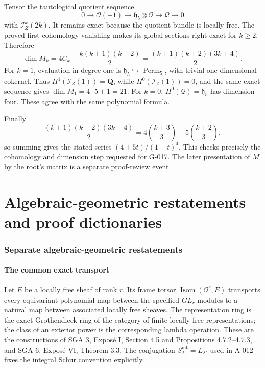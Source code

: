 \documentclass[
  10pt,
]{article}
\begin{document}
Tensor the tautological quotient sequence \[
0\to\mathcal O(-1)\to\mathfrak h_5\otimes\mathcal O
\to\mathcal Q\to0
\] with \(\mathcal I_Z^k(2k)\). It remains exact because the quotient
bundle is locally free. The proved first-cohomology vanishing makes its
global sections right exact for \(k\ge2\). Therefore \[
\dim M_k=4C_k-\frac{k(k+1)(k-2)}2
=\frac{(k+1)(k+2)(3k+4)}2.
\] For \(k=1\), evaluation in degree one is
\(\mathfrak h_5\hookrightarrow\operatorname{Perm}_5\), with trivial
one-dimensional cokernel. Thus \(H^1(\mathcal I_Z(1))=\mathbf Q\), while
\(H^0(\mathcal I_Z(1))=0\), and the same exact sequence gives
\(\dim M_1=4\cdot5+1=21\). For \(k=0\),
\(H^0(\mathcal Q)=\mathfrak h_5\) has dimension four. These agree with
the same polynomial formula.

Finally \[
\frac{(k+1)(k+2)(3k+4)}2
=4\binom{k+3}{3}+5\binom{k+2}{3},
\] so summing gives the stated series \((4+5t)/(1-t)^4\). This checks
precisely the cohomology and dimension step requested for G-017. The
later presentation of \(M\) by the root's matrix is a separate
proof-review event.

\part{Algebraic-geometric restatements and proof dictionaries}

\section{Separate algebraic-geometric
restatements}\label{separate-algebraic-geometric-restatements}

\subsection{The common exact
transport}\label{the-common-exact-transport}

Let \(E\) be a locally free sheaf of rank \(r\). Its frame torsor
\(\operatorname{Isom}(\mathcal O^r,E)\) transports every equivariant
polynomial map between the specified \(GL_r\)-modules to a natural map
between associated locally free sheaves. The representation ring is the
exact Grothendieck ring of the category of finite locally free
representations; the class of an exterior power is the corresponding
lambda operation. These are the constructions of SGA 3, Exposé I,
Section 4.5 and Propositions 4.7.2--4.7.3, and SGA 6, Exposé VI, Theorem
3.3. The conjugation \(S^{\mathrm{int}}_\lambda=L_{\lambda'}\) used in
A-012 fixes the integral Schur convention explicitly.
\end{document}
